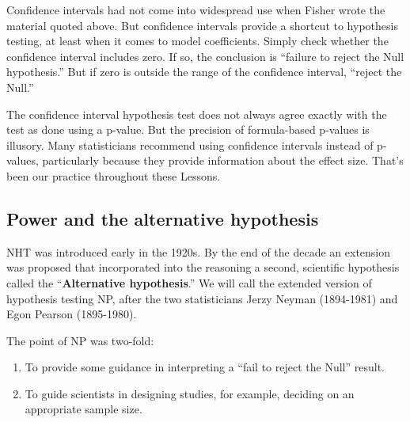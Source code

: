 \documentclass[
  letterpaper,
  DIV=11,
  numbers=noendperiod,
  oneside]{scrartcl}
\providecommand{\tightlist}{%
  \setlength{\itemsep}{0pt}\setlength{\parskip}{0pt}}\usepackage{longtable,booktabs,array}
\begin{document}
\begin{tcolorbox}[enhanced jigsaw, colbacktitle=quarto-callout-note-color!10!white, opacityback=0, breakable, opacitybacktitle=0.6, colback=white, coltitle=black, arc=.35mm, title=\textcolor{quarto-callout-note-color}{\faInfo}\hspace{0.5em}{Hypothesis test with confidence interval}, left=2mm, colframe=quarto-callout-note-color-frame, rightrule=.15mm, bottomrule=.15mm, leftrule=.75mm, bottomtitle=1mm, toptitle=1mm, titlerule=0mm, toprule=.15mm]

Confidence intervals had not come into widespread use when Fisher wrote
the material quoted above. {} But confidence intervals provide a shortcut
to hypothesis testing, at least when it comes to model coefficients.
Simply check whether the confidence interval includes zero. If so, the
conclusion is ``failure to reject the Null hypothesis.'' But if zero is
outside the range of the confidence interval, ``reject the Null.''

The confidence interval hypothesis test does not always agree exactly
with the test as done using a p-value. But the precision of
formula-based p-values is illusory. Many statisticians recommend using
confidence intervals instead of p-values, particularly because they
provide information about the effect size. That's been our practice
throughout these Lessons.

\end{tcolorbox}

\subsection{Power and the alternative
hypothesis}\label{power-and-the-alternative-hypothesis}

NHT was introduced early in the 1920s. By the end of the decade an
extension was proposed that incorporated into the reasoning a second,
scientific hypothesis called the ``\textbf{Alternative hypothesis}.'' We
will call the extended version of hypothesis testing NP, after the two
statisticians Jerzy Neyman (1894-1981) and Egon Pearson (1895-1980).

The point of NP was two-fold:

\begin{enumerate}
\def\labelenumi{\roman{enumi}.}
\tightlist
\item
  To provide some guidance in interpreting a ``fail to reject the Null''
  result.
\item
  To guide scientists in designing studies, for example, deciding on an
  appropriate sample size.
\end{enumerate}
\end{document}
